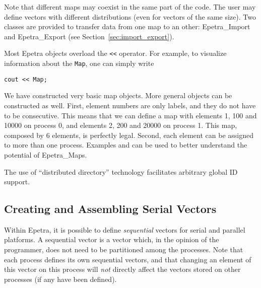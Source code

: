 \smallskip

Note that different maps may coexist in the same part of the code.  The
user may define vectors with different distributions (even for vectors
of the same size).  Two classes are provided to transfer data from one
map to an other: Epetra\_Import and Epetra\_Export (see
Section~\ref{sec:import_export}).

\begin{remark}
Most Epetra objects overload the \verb!<<! operator. For example, to
visualize information about the \verb!Map!, one can simply write
\begin{verbatim}
cout << Map;
\end{verbatim}
\end{remark}

We have constructed very basic map objects.  More general objects can be
constructed as well. First, element numbers are only labels, and they do
not have to be consecutive.  This means that we can define a map with
elements 1, 100 and 10000 on process 0, and elements 2, 200 and 20000 on
process 1. This map, composed by 6 elements, is perfectly legal. Second,
each element can be assigned to more than one process. Examples
 and  can be used to
better understand the potential of Epetra\_Maps.

\begin{remark}
  The use of ``distributed directory'' technology facilitates arbitrary
  global ID support.
\end{remark}


\subsection{Creating and Assembling Serial Vectors}
\label{sec:serial_vec}

Within Epetra, it is possible to define {\em sequential} vectors for
serial and parallel platforms. A sequential vector is a vector which, in
the opinion of the programmer, does not need to be partitioned among the
processes.  Note that each process defines its own sequential vectors,
and that changing an element of this vector on this process will {\em
  not} directly affect the vectors stored on other processes (if any
have been defined).

